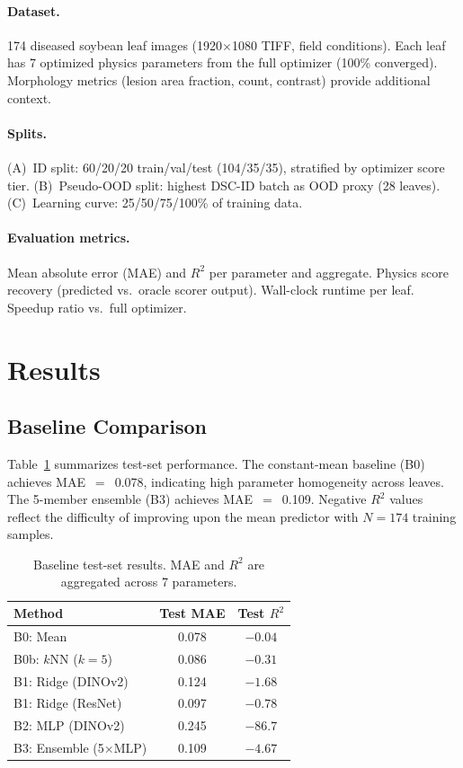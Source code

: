 \documentclass[11pt,a4paper]{article}
\begin{document}
\paragraph{Dataset.}
174 diseased soybean leaf images (1920$\times$1080 TIFF, field conditions).
Each leaf has 7 optimized physics parameters from the full optimizer (100\% converged).
Morphology metrics (lesion area fraction, count, contrast) provide additional context.

\paragraph{Splits.}
(A)~ID split: 60/20/20 train/val/test (104/35/35), stratified by optimizer score tier.
(B)~Pseudo-OOD split: highest DSC-ID batch as OOD proxy (28 leaves).
(C)~Learning curve: 25/50/75/100\% of training data.

\paragraph{Evaluation metrics.}
Mean absolute error (MAE) and $R^2$ per parameter and aggregate.
Physics score recovery (predicted vs.\ oracle scorer output).
Wall-clock runtime per leaf. Speedup ratio vs.\ full optimizer.

\section{Results}
\label{sec:results}

\subsection{Baseline Comparison}

Table~\ref{tab:baselines} summarizes test-set performance.
The constant-mean baseline (B0) achieves MAE~$=$~0.078,
indicating high parameter homogeneity across leaves.
The 5-member ensemble (B3) achieves MAE~$=$~0.109.
Negative $R^2$ values reflect the difficulty of improving
upon the mean predictor with $N{=}174$ training samples.

\begin{table}[h]
\centering
\caption{Baseline test-set results. MAE and $R^2$ are aggregated across 7 parameters.}
\label{tab:baselines}
\begin{tabular}{lcc}
\toprule
Method & Test MAE & Test $R^2$ \\
\midrule
B0: Mean            & 0.078 & $-0.04$ \\
B0b: $k$NN ($k{=}5$)  & 0.086 & $-0.31$ \\
B1: Ridge (DINOv2)  & 0.124 & $-1.68$ \\
B1: Ridge (ResNet)  & 0.097 & $-0.78$ \\
B2: MLP (DINOv2)    & 0.245 & $-86.7$ \\
B3: Ensemble (5$\times$MLP) & 0.109 & $-4.67$ \\
\bottomrule
\end{tabular}
\end{table}
\end{document}
